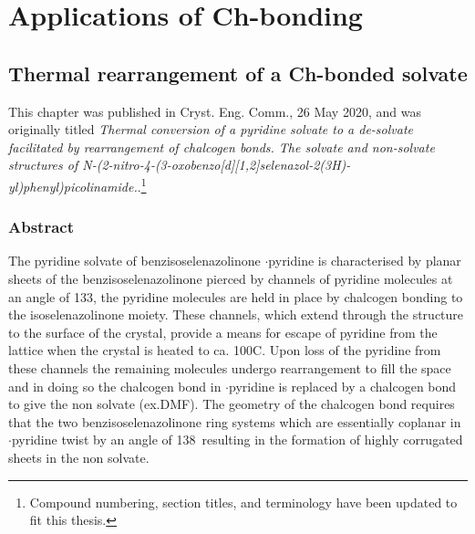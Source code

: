 \part{Applications of Ch-bonding}

\begin{refsection}

\chapter{Thermal rearrangement of a Ch-bonded solvate}\label{sec:thermal-conversion}

This chapter was published in Cryst. Eng. Comm., 26 May 2020, and was originally titled \emph{Thermal conversion of a pyridine solvate to a de-solvate facilitated by rearrangement of chalcogen bonds. The solvate and non-solvate structures of N-(2-nitro-4-(3-oxobenzo[\emph{d}][1,2]selenazol-2(3\emph{H})-yl)phenyl)picolinamide.}\autocite{Fellowes2020a}.\footnote{Compound numbering, section titles, and terminology have been updated to fit this thesis.}

\section{Abstract}
The pyridine solvate of benzisoselenazolinone $\cdot$pyridine is characterised by planar sheets of the benzisoselenazolinone  pierced by channels of pyridine molecules at an angle of 133\degree, the pyridine molecules are held in place by  chalcogen bonding to the isoselenazolinone moiety.
These channels, which extend through the structure to the surface of the crystal, provide a means for escape of pyridine from the lattice when the crystal is heated to ca. 100\degree{}C.
Upon loss of the pyridine from these channels the remaining molecules undergo rearrangement to fill the space and in doing so the  chalcogen bond in $\cdot$pyridine is replaced by a  chalcogen bond to give the non solvate (ex.DMF).
The geometry of the chalcogen bond requires that the two benzisoselenazolinone ring systems which are essentially coplanar in $\cdot$pyridine twist by an angle of 138\degree~resulting in the formation of highly corrugated sheets in the non solvate.


\end{refsection}
